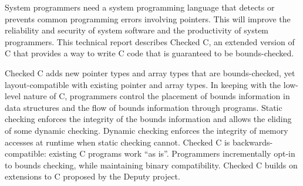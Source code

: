 
\parbox{5in}{
System programmers need a system programming language that
detects or prevents common programming errors involving pointers. This
will improve the reliability and security of system software and
the productivity of system programmers. This technical report describes
Checked C, an extended version of C that provides a way to write C code that
is guaranteed to be bounds-checked.
}
\vspace{11pt}

\parbox{5in}{
Checked C adds new pointer types and array types that are
bounds-checked, yet layout-compatible with existing pointer and array
types. In keeping with the low-level nature of C, 
programmers control the placement of bounds information in data
structures and the flow of bounds information through programs. Static
checking enforces the integrity of the bounds information and allows the
eliding of some dynamic checking. Dynamic checking enforces the
integrity of memory accesses at runtime when static checking cannot.
Checked C is backwards-compatible: existing C programs work
``as is''. Programmers incrementally opt-in to bounds checking, while
maintaining binary compatibility. Checked C builds on extensions to C
proposed by the Deputy project.
}


